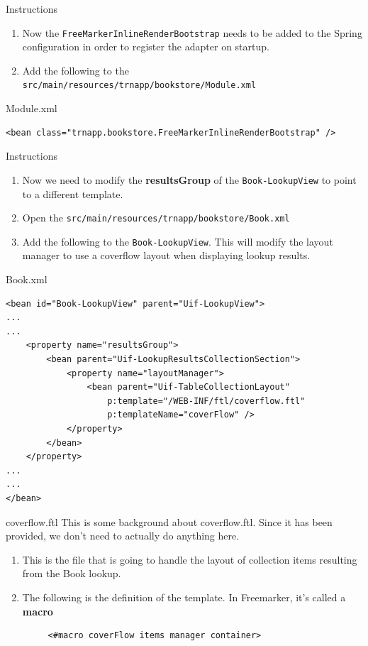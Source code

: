 \documentclass[xcolor=dvipsnames,14pt,professionalfonts]{beamer}
\begin{document}
\begin{frame}{Instructions}
  \begin{enumerate}
    \item Now the \texttt{FreeMarkerInlineRenderBootstrap} needs to be
      added to the Spring configuration in order to register the
      adapter on startup.
    \item Add the following to the 
      \texttt{src/main/resources/trnapp/bookstore/Module.xml}
  \end{enumerate}
\end{frame}

 \begin{frame}[fragile]{Module.xml}
   \begin{verbatim}
<bean class="trnapp.bookstore.FreeMarkerInlineRenderBootstrap" />
    \end{verbatim}
\end{frame}

\begin{frame}{Instructions}
  \begin{enumerate}
    \item Now we need to modify the \textbf{resultsGroup} of the
      \texttt{Book-LookupView} to point to a different template.
    \item Open the
      \texttt{src/main/resources/trnapp/bookstore/Book.xml}
    \item Add the following to the \texttt{Book-LookupView}. This will
      modify the layout manager to use a coverflow layout when
      displaying lookup results.
  \end{enumerate}
\end{frame}

 \begin{frame}[fragile]{Book.xml}
   \begin{verbatim}
<bean id="Book-LookupView" parent="Uif-LookupView">
...
...
	<property name="resultsGroup">
    	<bean parent="Uif-LookupResultsCollectionSection">
    		<property name="layoutManager">
    			<bean parent="Uif-TableCollectionLayout" 
    				p:template="/WEB-INF/ftl/coverflow.ftl" 
    				p:templateName="coverFlow" />
    		</property>
    	</bean>
    </property>
...
...
</bean>
    \end{verbatim}
\end{frame}

 \begin{frame}[fragile]{coverflow.ftl}
   This is some background about coverflow.ftl. Since it has been
   provided, we don't need to actually do anything here.
  \begin{enumerate}
    \item This is the file that is going to handle the layout of
      collection items resulting from the Book lookup.
    \item The following is the definition of the template. In
      Freemarker, it's called a \textbf{macro}
   \begin{verbatim}
     <#macro coverFlow items manager container>
   \end{verbatim}
 \end{enumerate}
\end{frame}
\end{document}
